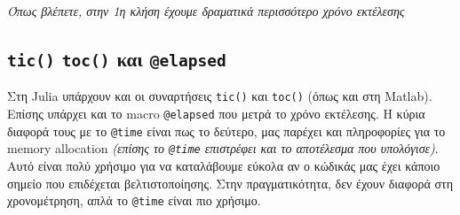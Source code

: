 \documentclass[]{article}
\begin{document}
\emph{Όπως βλέπετε, στην 1η κλήση έχουμε δραματικά περισσότερο χρόνο
εκτέλεσης}

\subsection{\texorpdfstring{\texttt{tic()} \texttt{toc()} και
\texttt{@elapsed}}{tic() toc() και @elapsed}}\label{tic-toc-ux3baux3b1ux3b9-elapsed}

Στη Julia υπάρχουν και οι συναρτήσεις \texttt{tic()} και \texttt{toc()}
(όπως και στη Matlab). Επίσης υπάρχει και το macro \texttt{@elapsed} που
μετρά το χρόνο εκτέλεσης. Η κύρια διαφορά τους με το \texttt{@time}
είναι πως το δεύτερο, μας παρέχει και πληροφορίες για το memory
allocation \emph{(επίσης το \texttt{@time} επιστρέφει και το αποτέλεσμα
που υπολόγισε)}. Αυτό είναι πολύ χρήσιμο για να καταλάβουμε εύκολα αν ο
κώδικάς μας έχει κάποιο σημείο που επιδέχεται βελτιστοποίησης. Στην
πραγματικότητα, δεν έχουν διαφορά στη χρονομέτρηση, απλά το
\texttt{@time} είναι πιο χρήσιμο.
\end{document}
